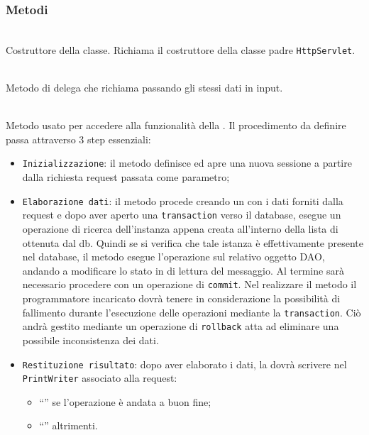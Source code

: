 \subsubsection*{Metodi}
\begin{description}
	\item{}\\
	Costruttore della classe. Richiama il costruttore della classe padre \texttt{HttpServlet}.
	
	\item{}\\
	Metodo di delega che richiama  passando gli stessi dati in input.
	
	\item{}\\
	Metodo usato per accedere alla funzionalità della . Il procedimento da definire passa attraverso 3 step essenziali:
	\begin{itemize}
		\item \texttt{Inizializzazione}: il metodo definisce ed apre una nuova sessione a partire dalla richiesta request passata come parametro;
		\item \texttt{Elaborazione dati}: il metodo procede creando un  con i dati forniti dalla request e dopo aver aperto una \texttt{transaction} verso il database, esegue un operazione di ricerca dell'instanza appena creata all'interno della lista di  ottenuta dal db. Quindi se si verifica che tale istanza è effettivamente presente nel database, il metodo esegue l'operazione  sul relativo oggetto DAO, andando a modificare lo stato in di lettura del messaggio. Al termine sarà necessario procedere con un operazione di \texttt{commit}. Nel realizzare il metodo il programmatore incaricato dovrà tenere in considerazione la possibilità di fallimento durante l'esecuzione delle operazioni mediante la \texttt{transaction}. Ciò andrà gestito mediante un operazione di \texttt{rollback} atta ad eliminare una possibile inconsistenza dei dati.
		\item \texttt{Restituzione risultato}: dopo aver elaborato i dati, la  dovrà scrivere nel \texttt{PrintWriter} associato alla request:
			\begin{itemize}
				\item ``'' se l'operazione è andata a buon fine;
				\item ``'' altrimenti.
			\end{itemize}
	\end{itemize}

\end{description}

